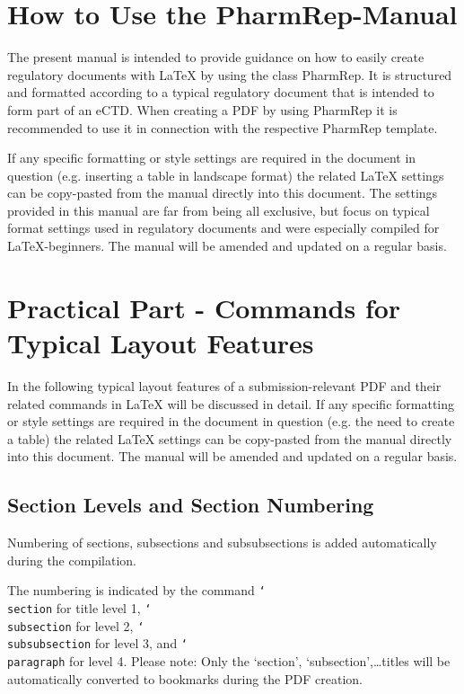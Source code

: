 \documentclass{pharmrep}
\newcommand{\PharmRep}{\textsf{PharmRep}\xspace}
\DeclareRobustCommand\cs[1]{\texttt{\char`\\#1}}
\begin{document}
\section{How to Use the PharmRep-Manual}
The present manual is intended to provide guidance on how to easily create regulatory documents with \LaTeX{} by using the class \PharmRep.
It is structured and formatted according to a typical regulatory document that is intended to form part of an eCTD. When creating a PDF by using \PharmRep
it is recommended to use it in connection with the respective \PharmRep template.

If any specific formatting or style settings are required in the document in question (e.g. inserting a table in landscape format) the related \LaTeX{} settings
can be copy-pasted from the manual directly into this document. The settings provided in this manual are far from being all exclusive, but focus on typical format
settings used in regulatory documents and were especially compiled for \LaTeX{}-beginners.
The manual will be amended and updated on a regular basis.

\section{Practical Part - Commands for Typical Layout Features}
In the following typical layout features of a submission-relevant PDF and their related commands in \LaTeX{} will be
discussed in detail.
If any specific formatting or style settings are required in the document in question (e.g. the need to
create a table) the related \LaTeX{} settings can be copy-pasted from the manual directly into this document.
The manual will be amended and updated on a regular basis.

\subsection{Section Levels and Section Numbering}
Numbering of sections, subsections and subsubsections is added automatically during the compilation.

The numbering is indicated by the command \cs{section} for title level 1, \cs{subsection} for level 2,
\cs{subsubsection} for level 3, and \cs{paragraph} for level 4.
Please note: Only the `section', `subsection',\dots titles will be automatically converted to bookmarks during
the PDF creation.
\end{document}
